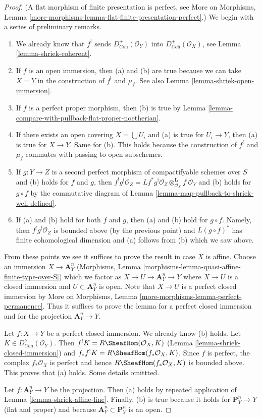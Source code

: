 \begin{proof}
(A flat morphism of finite presentation is perfect, see
More on Morphisms, Lemma
\ref{more-morphisms-lemma-flat-finite-presentation-perfect}.)
We begin with a series of preliminary remarks.
\begin{enumerate}
\item We already know that $f^!$ sends $D_{\textit{Coh}}^+(\mathcal{O}_Y)$
into $D_{\textit{Coh}}^+(\mathcal{O}_X)$, see
Lemma \ref{lemma-shriek-coherent}.
\item If $f$ is an open immersion, then (a) and (b) are true because
we can take $\overline{X} = Y$ in the construction of $f^!$ and $\mu_f$.
See also Lemma \ref{lemma-shriek-open-immersion}.
\item If $f$ is a perfect proper morphism, then (b) is true by
Lemma \ref{lemma-compare-with-pullback-flat-proper-noetherian}.
\item If there exists an open covering $X = \bigcup U_i$ and (a) is
true for $U_i \to Y$, then (a) is true for $X \to Y$. Same for (b).
This holds because the construction of $f^!$ and $\mu_f$ commutes
with passing to open subschemes.
\item If $g : Y \to Z$ is a second perfect morphism of compactifyable
schemes over $S$ and (b) holds for $f$ and $g$, then
$f^!g^!\mathcal{O}_Z =
Lf^*g^!\mathcal{O}_Z \otimes_{\mathcal{O}_X}^\mathbf{L} f^!\mathcal{O}_Y$
and (b) holds for $g \circ f$ by the commutative diagram
of Lemma \ref{lemma-map-pullback-to-shriek-well-defined}.
\item If (a) and (b) hold for both $f$ and $g$, then
(a) and (b) hold for $g \circ f$. Namely, then $f^!g^!\mathcal{O}_Z$
is bounded above (by the previous point) and $L(g \circ f)^*$ has finite
cohomological dimension and (a) follows from (b) which we saw above.
\end{enumerate}
From these points we see it suffices to prove the result in case $X$ is affine.
Choose an immersion $X \to \mathbf{A}^n_Y$
(Morphisms, Lemma \ref{morphisms-lemma-quasi-affine-finite-type-over-S})
which we factor as $X \to U \to \mathbf{A}^n_Y \to Y$ where $X \to U$
is a closed immersion and $U \subset \mathbf{A}^n_Y$ is open.
Note that $X \to U$ is a perfect closed immersion by
More on Morphisms, Lemma \ref{more-morphisms-lemma-perfect-permanence}.
Thus it suffices to prove the lemma for a perfect closed immersion
and for the projection $\mathbf{A}^n_Y \to Y$.

\medskip\noindent
Let $f : X \to Y$ be a perfect closed immersion. We already know (b) holds.
Let $K \in D^b_{\textit{Coh}}(\mathcal{O}_Y)$.
Then $f^!K = R\SheafHom(\mathcal{O}_X, K)$
(Lemma \ref{lemma-shriek-closed-immersion})
and $f_*f^!K = R\SheafHom(f_*\mathcal{O}_X, K)$.
Since $f$ is perfect, the complex $f_*\mathcal{O}_X$ is perfect
and hence $R\SheafHom(f_*\mathcal{O}_X, K)$ is bounded above.
This proves that (a) holds. Some details omittted.

\medskip\noindent
Let $f : \mathbf{A}^n_Y \to Y$ be the projection. Then (a) holds
by repeated application of Lemma \ref{lemma-shriek-affine-line}.
Finally, (b) is true because it holds for $\mathbf{P}^n_Y \to Y$
(flat and proper) and because $\mathbf{A}^n_Y \subset \mathbf{P}^n_Y$
is an open.
\end{proof}

